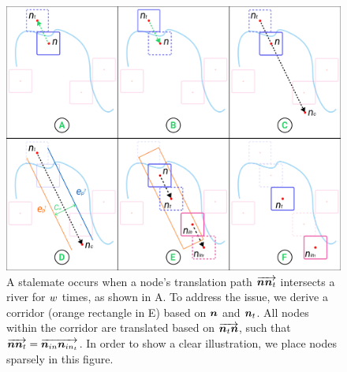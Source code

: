 {
\begin{figure}[tb!]
    \centering
    \includegraphics[width=\columnwidth]{figure/corridor.png}
    \caption{A stalemate occurs when a node's translation path $ \protect\overrightarrow{\bm{n}\bm{n}_t} $ intersects a river for $ w $ times, as shown in A. To address the issue, we derive a corridor (orange rectangle in E) based on $ \bm{n} $ and $ \bm{n}_t $. All nodes within the corridor are translated based on $ \protect\overrightarrow{\bm{n}_t\bm{n}} $, such that $ \protect\overrightarrow{\bm{n}\bm{n}_{t}} = \protect\overrightarrow{\bm{n}_{in}\bm{n}_{in_t}} $. In order to show a clear illustration, we place nodes sparsely in this figure.}
    \label{fig:corridor}
\end{figure}
}


